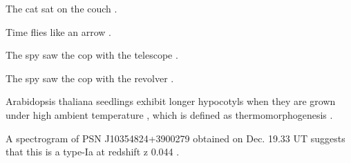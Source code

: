 \begin{description}[leftmargin=2em, style=sameline, itemsep=1pt]
\item[S1] The cat sat on the couch .
\item[S2] Time flies like an arrow .
\item[S3] The spy saw the cop with the telescope .
\item[S4] The spy saw the cop with the revolver .
\item[S5] Arabidopsis thaliana seedlings exhibit longer hypocotyls when they are grown under high ambient temperature , which is defined as thermomorphogenesis .
\item[S6] A spectrogram of PSN J10354824+3900279 obtained on Dec. 19.33 UT suggests that this is a type-Ia at redshift z 0.044 .
\end{description}
